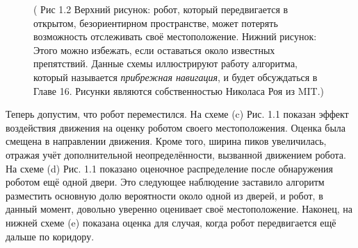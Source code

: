 \documentclass[10pt,a4paper]{article}
\begin{document}
\begin{figure}
	\caption{ ( Рис 1.2 Верхний рисунок: робот, который передвигается в открытом, безориентирном пространстве, может потерять возможность отслеживать своё местоположение. Нижний рисунок: Этого можно избежать, если оставаться около известных препятствий. Данные схемы иллюстрируют работу алгоритма, который называется  \textit{прибрежная навигация}, и будет обсуждаться в Главе 16. Рисунки являются собственностью Николаса Роя из MIT.)}
	\label{fig:12orig}
\end{figure}

Теперь допустим, что робот переместился. На схеме (c) Рис. 1.1 показан эффект воздействия движения на оценку роботом своего местоположения. Оценка была смещена в направлении движения.  Кроме того, ширина пиков увеличилась, отражая учёт дополнительной неопределённости, вызванной движением робота. На схеме (d) Рис. 1.1 показано оценочное распределение после обнаружения роботом ещё одной двери. Это следующее наблюдение заставило алгоритм разместить основную долю вероятности около одной из дверей, и робот, в данный момент, довольно уверенно оценивает своё местоположение. Наконец, на нижней схеме (e) показана оценка для случая, когда робот передвигается ещё дальше по коридору.
\end{document}
